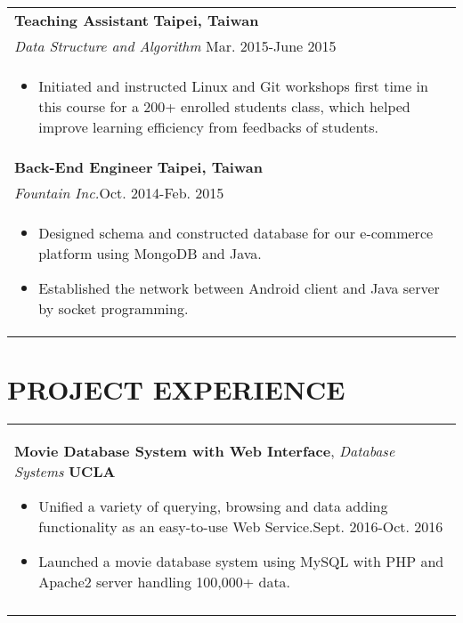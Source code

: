 \documentclass[a4paper,10pt]{article} %
\begin{document}
{\begin{tabular}{p{18.5cm}}
{\fontsize{11}{13.2}\textbf{Teaching Assistant}} \hfill \textbf{Taipei, Taiwan}\\
{\it Data Structure and Algorithm} \hfill  Mar. 2015-June 2015 \\%
\begin{itemize}
\vspace{-2mm}
\item Initiated and instructed Linux and Git workshops first time in this course for a 200+ enrolled students class, which helped improve learning efficiency from feedbacks of students.\vspace*{-\baselineskip}
\end{itemize} \\ 
\vspace{0.5mm}

{\fontsize{11}{13.2}\textbf{Back-End Engineer}} \hfill \textbf{Taipei, Taiwan}\\ 
{\it Fountain Inc.}\hfill  Oct. 2014-Feb. 2015  \\%
\begin{itemize}
\vspace{-2mm}
\item Designed schema and constructed database for our e-commerce platform using MongoDB and Java. 
\item Established the network between Android client and Java server by socket programming. \vspace*{-\baselineskip}
\end{itemize}\\
\end{tabular}


\section{\textbf{PROJECT EXPERIENCE}}
\begin{tabular}{p{18.5cm}}

{\fontsize{11}{13.2}\textbf{Movie Database System with Web Interface}}, {\it{Database Systems}} \hfill \textbf{UCLA} 
\vspace{0.5mm}
\begin{itemize}
\item Unified a variety of querying, browsing and data adding functionality as an easy-to-use Web Service.\hfill Sept. 2016-Oct. 2016
\item Launched a movie database system using MySQL with PHP and Apache2 server handling 100,000+ data.\vspace*{-\baselineskip}
\end{itemize} \\
\vspace{0.5mm}


\end{tabular}}
\end{document}
